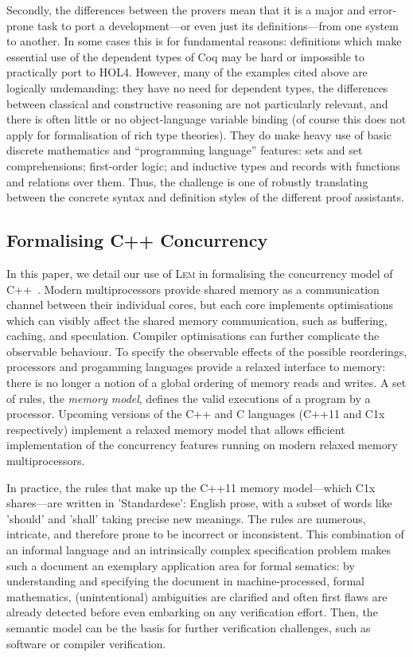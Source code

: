 \documentclass[a4paper]{llncs}
\newcommand{\Lem}{\textsc{Lem}}
\begin{document}
Secondly, the differences between the provers mean that it is a major and
error-prone task to port a development---or even just its definitions---from one
system to another.  In some cases this is for fundamental reasons:  definitions
which make essential use of the dependent types of Coq may be hard or impossible
to practically port to HOL4.  However, many of the examples cited above are
logically undemanding: they have no need for dependent types, the differences
between classical and constructive reasoning are not particularly relevant, and
there is often little or no object-language variable binding (of course this
does not apply for formalisation of rich type theories).   They do make heavy
use of basic discrete mathematics and ``programming language'' features: sets
and set comprehensions; first-order logic; and inductive types and records with
functions and relations over them.  Thus, the challenge is one of robustly
translating between the concrete syntax and definition styles of the different
proof assistants.


\subsection{Formalising C++ Concurrency}\label{sub:cppmotivation}

In this paper, we detail our use of \Lem{} in formalising the concurrency model of C++~\cite{C++}.
Modern multiprocessors provide shared memory as a communication channel between
their individual cores, but each core implements optimisations which can
visibly affect the shared memory communication, such as buffering, caching, and
speculation.  Compiler optimisations can further complicate the observable
behaviour. To specify the observable effects of the possible reorderings,
processors and progamming languages provide a relaxed interface to memory:
there is no longer a notion of a global ordering of memory reads and writes. A
set of rules, the \emph{memory model}, defines the valid executions of a
program by a processor.  Upcoming versions of the C++ and C languages (C++11
and C1x respectively) implement a relaxed memory model that allows efficient
implementation of the concurrency features running on modern relaxed memory
multiprocessors.

In practice, the rules that make up the C++11 memory model---which C1x
shares---are written in 'Standardese': English prose, with a subset of words
like 'should' and 'shall' taking precise new meanings. The rules are numerous,
intricate, and therefore prone to be incorrect or inconsistent. This combination
of an informal language and an intrinsically complex specification problem makes
such a document an exemplary application area for formal sematics: by
understanding and specifying the document in machine-processed, formal
mathematics, (unintentional) ambiguities are clarified and often first flaws are
already detected before even embarking on any verification effort. Then, the
semantic model can be the basis for further verification challenges, such as
software or compiler verification.
\end{document}
